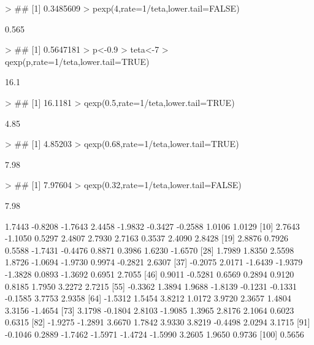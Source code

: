 \documentclass{article}
\begin{document}
\begin{Schunk}
\begin{Sinput}
> ## [1] 0.3485609
> pexp(4,rate=1/teta,lower.tail=FALSE)
\end{Sinput}
\begin{Soutput}
[1] 0.565
\end{Soutput}
\begin{Sinput}
> ## [1] 0.5647181
> p<-0.9
> teta<-7
> qexp(p,rate=1/teta,lower.tail=TRUE)
\end{Sinput}
\begin{Soutput}
[1] 16.1
\end{Soutput}
\begin{Sinput}
> ## [1] 16.1181
> qexp(0.5,rate=1/teta,lower.tail=TRUE)
\end{Sinput}
\begin{Soutput}
[1] 4.85
\end{Soutput}
\begin{Sinput}
> ## [1] 4.85203
> qexp(0.68,rate=1/teta,lower.tail=TRUE)
\end{Sinput}
\begin{Soutput}
[1] 7.98
\end{Soutput}
\begin{Sinput}
> ## [1] 7.97604
> qexp(0.32,rate=1/teta,lower.tail=FALSE)
\end{Sinput}
\begin{Soutput}
[1] 7.98
\end{Soutput}
\begin{Soutput}
  [1]  1.7443 -0.8208 -1.7643  2.4458 -1.9832 -0.3427 -0.2588  1.0106  1.0129
 [10]  2.7643 -1.1050  0.5297  2.4807  2.7930  2.7163  0.3537  2.4090  2.8428
 [19]  2.8876  0.7926  0.5588 -1.7431 -0.4476  0.8871  0.3986  1.6230 -1.6570
 [28]  1.7989  1.8350  2.5598  1.8726 -1.0694 -1.9730  0.9974 -0.2821  2.6307
 [37] -0.2075  2.0171 -1.6439 -1.9379 -1.3828  0.0893 -1.3692  0.6951  2.7055
 [46]  0.9011 -0.5281  0.6569  0.2894  0.9120  0.8185  1.7950  3.2272  2.7215
 [55] -0.3362  1.3894  1.9688 -1.8139 -0.1231 -0.1331 -0.1585  3.7753  2.9358
 [64] -1.5312  1.5454  3.8212  1.0172  3.9720  2.3657  1.4804  3.3156 -1.4654
 [73]  3.1798 -0.1804  2.8103 -1.9085  1.3965  2.8176  2.1064  0.6023  0.6315
 [82] -1.9275 -1.2891  3.6670  1.7842  3.9330  3.8219 -0.4498  2.0294  3.1715
 [91] -0.1046  0.2889 -1.7462 -1.5971 -1.4724 -1.5990  3.2605  1.9650  0.9736
[100]  0.5656
\end{Soutput}

\end{Schunk}
\end{document}
